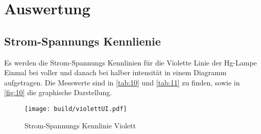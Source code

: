 \section{Auswertung}
\label{sec:Auswertung}
\subsection{Strom-Spannungs Kennlienie}
Es werden die Strom-Spannungs Kennlinien für die Violette Linie der 
Hg-Lampe Einmal bei voller und danach bei halber intensität in einem 
Diagramm aufgetragen. Die Messwerte sind in \autoref{tab:10} und \autoref{tab:11} 
 zu finden, sowie in \autoref{fig:10} die graphische Darstellung.

\begin{figure}[H]
    \centering
    \caption{Strom-Spannungs Kennlinie Violett}
    \label{fig:10}
    \texttt{[image: build/violettUI.pdf]}
\end{figure}    

